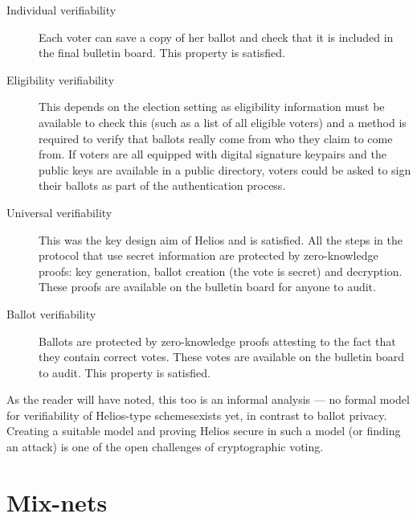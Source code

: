 \documentclass[envcountsame]{llncs}
\begin{document}
\begin{description}
\item[Individual verifiability]
Each voter can save a copy of her ballot and check that it is included in the
final bulletin board. This property is satisfied.

\item[Eligibility verifiability]
This depends on the election setting as eligibility information must be
available to check this (such as a list of all eligible voters) and a method is
required to verify that ballots really come from who they claim to come from. If
voters are all equipped with digital signature keypairs and the public keys are
available in a public directory, voters could be asked to sign their ballots as
part of the authentication process.

\item[Universal verifiability]
This was the key design aim of Helios and is satisfied. All the steps in the
protocol that use secret information are protected by zero-knowledge proofs:
key generation, ballot creation (the vote is secret) and decryption. These
proofs are available on the bulletin board for anyone to audit.

\item[Ballot verifiability]
Ballots are protected by zero-knowledge proofs attesting to the fact that they
contain correct votes. These votes are available on the bulletin board to audit.
This property is satisfied\footnotemark.
\end{description}


As the reader will have noted, this too is an informal analysis --- no formal
model for verifiability of Helios-type schemes\footnotemark exists yet, in
contrast to ballot privacy. Creating a suitable model and proving Helios secure
in such a model (or finding an attack) is one of the open challenges of
cryptographic voting.


\section{Mix-nets}
\label{sec:mixnet}
\end{document}
